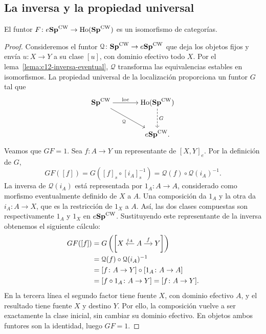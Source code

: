 \subsection{La inversa y la propiedad universal}

\begin{teo}\label{teo:c12-comparacion-eventual}
El funtor $F\colon e\mathbf{Sp}^{\mathrm{CW}}\to\operatorname{Ho}(\mathbf{Sp}^{\mathrm{CW}})$ es un isomorfismo de categorías.
\end{teo}
\begin{proof}
Consideremos el funtor $\mathcal Q\colon\mathbf{Sp}^{\mathrm{CW}}\to e\mathbf{Sp}^{\mathrm{CW}}$ que deja los objetos fijos y envía $u\colon X\to Y$ a su clase $[u]$, con dominio efectivo todo $X$. Por el lema~\ref{lema:c12-inversa-eventual}, $\mathcal Q$ transforma las equivalencias estables en isomorfismos. La propiedad universal de la localización proporciona un funtor $G$ tal que
\[
\begin{tikzcd}[cramped,column sep=large,row sep=large]
\Sp^{\mathrm{CW}} \arrow[r,"\operatorname{loc}"] \arrow[dr,"\mathcal Q"']
& \Ho(\Sp^{\mathrm{CW}}) \arrow[d,dashed,"G"]\\
& e\Sp^{\mathrm{CW}}.
\end{tikzcd}
\]

Veamos que $GF=1$. Sea $f\colon A\to Y$ un representante de $[X,Y]_e$. Por la definición de $G$,
\[
GF([f])=G([f]_s\circ[i_A]_s^{-1})
=\mathcal Q(f)\circ\mathcal Q(i_A)^{-1}.
\]
La inversa de $\mathcal Q(i_A)$ está representada por $1_A\colon A\to A$, considerado como morfismo eventualmente definido de $X$ a $A$. Una composición da $1_A$ y la otra da $i_A\colon A\to X$, que es la restricción de $1_X$ a $A$. Así, las dos clases compuestas son respectivamente $1_A$ y $1_X$ en $e\mathbf{Sp}^{\mathrm{CW}}$. Sustituyendo este representante de la inversa obtenemos el siguiente cálculo:
\[
\begin{aligned}
GF([f])&=G\left(\left[\begin{tikzcd}[cramped,column sep=small,ampersand replacement=\&]
X \& A \arrow[l,"i_A"'] \arrow[r,"f"] \& Y
\end{tikzcd}\right]\right)\\
&=\mathcal Q(f)\circ\mathcal Q(i_A)^{-1}\\
&=[f\colon A\to Y]\circ[1_A\colon A\to A]\\
&=[f\circ1_A\colon A\to Y]=[f\colon A\to Y].
\end{aligned}
\]
En la tercera línea el segundo factor tiene fuente $X$, con dominio efectivo $A$, y el resultado tiene fuente $X$ y destino $Y$. Por ello, la composición vuelve a ser exactamente la clase inicial, sin cambiar su dominio efectivo. En objetos ambos funtores son la identidad, luego $GF=1$.


\end{proof}
